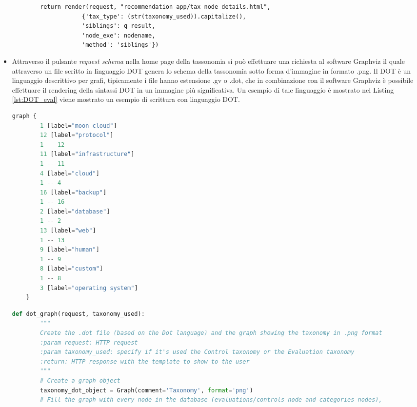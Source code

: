 \begin{itemize}
\begin{lstlisting}
        return render(request, "recommendation_app/tax_node_details.html",
                    {'tax_type': (str(taxonomy_used)).capitalize(),
                    'siblings': q_result,
                    'node_exe': nodename,
                    'method': 'siblings'})
    \end{lstlisting}
    \item Attraverso il pulsante \textit{request schema} nella home page della tassonomia si può effettuare una richiesta al software 
    Graphviz il quale attraverso un file scritto in linguaggio DOT genera lo schema della tassonomia sotto forma d'immagine in formato .png.\hfill\break
    Il DOT è un linguaggio descrittivo per grafi, tipicamente i file hanno estensione .gv o .dot, che in combinazione con il software Graphviz è possibile 
    effettuare il rendering della sintassi DOT in un immagine più significativa. Un esempio di tale linguaggio è mostrato nel Listing \ref{lst:DOT_eval} 
    viene mostrato un esempio di scrittura con linguaggio DOT.
    \lstset{style=python_code_style}
    \begin{lstlisting}[language=Python, label=lst:DOT_eval, caption={Codice parziale utilizzato per realizzare lo schema della tassonomia
        per le Evaluation.}]
    graph {
        1 [label="moon cloud"]
        12 [label="protocol"]
        1 -- 12
        11 [label="infrastructure"]
        1 -- 11
        4 [label="cloud"]
        1 -- 4
        16 [label="backup"]
        1 -- 16
        2 [label="database"]
        1 -- 2
        13 [label="web"]
        1 -- 13
        9 [label="human"]
        1 -- 9
        8 [label="custom"]
        1 -- 8
        3 [label="operating system"]
    }
    \end{lstlisting}
    \lstset{style=python_code_style}
    \begin{lstlisting}[language=Python, label=lst:view_DOT_eval, caption={Codice utilizzato per la realizzazione del
        file .dot e relativa immagine .png.}]
    def dot_graph(request, taxonomy_used):
        """
        Create the .dot file (based on the Dot language) and the graph showing the taxonomy in .png format
        :param request: HTTP request
        :param taxonomy_used: specify if it's used the Control taxonomy or the Evaluation taxonomy
        :return: HTTP response with the template to show to the user
        """
        # Create a graph object
        taxonomy_dot_object = Graph(comment='Taxonomy', format='png')
        # Fill the graph with every node in the database (evaluations/controls node and categories nodes), 

\end{lstlisting}
\end{itemize}
